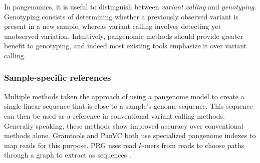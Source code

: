In pangenomics, it is useful to distinguish between \emph{variant calling} and \emph{genotyping}.
Genotyping consists of determining whether a previously observed variant is present in a new sample, whereas variant calling involves detecting yet unobserved variation.
Intuitively, pangenomic methods should provide greater benefit to genotyping, and indeed most existing tools emphasize it over variant calling.



\subsubsection{Sample-specific references}

Multiple methods taken the approach of using a pangenome model to create a single linear sequence that is close to a sample's genome sequence.   
This sequence can then be used as a reference in conventional variant calling methods. 
Generally speaking, these methods show improved accuracy over conventional methods alone.
Gramtools \cite{Maciuca_2016} and PanVC \cite{Valenzuela_2018} both use specialized pangenome indexes to map reads for this purpose.
PRG uses read $k$-mers from reads to choose paths through a graph to extract as sequences \cite{dilthey2015improved}.

